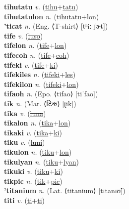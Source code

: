 \textbf{tihutatu} \textit{v.} (\hyperref[tihu]{tihu}+\hyperref[tatu]{tatu})
 \label{tihutatu} \\
\textbf{tihutatulon} \textit{n.} (\hyperref[tihutatu]{tihutatu}+\hyperref[lon]{lon})
 \label{tihutatulon} \\
\textbf{'ticat} \textit{n.} (Eng. ⟨T-shirt⟩ [tʰiː ʃɚt])
 \label{'ticat} \\
\textbf{tife} \textit{v.} (\hyperref[luso]{\sout{luso}})
 \label{tife} \\
\textbf{tifelon} \textit{n.} (\hyperref[tife]{tife}+\hyperref[lon]{lon})
 \label{tifelon} \\
\textbf{tifecoh} \textit{n.} (\hyperref[tife]{tife}+\hyperref[coh]{coh})
 \label{tifecoh} \\
\textbf{tifeki} \textit{v.} (\hyperref[tife]{tife}+\hyperref[ki]{ki})
 \label{tifeki} \\
\textbf{tifekiles} \textit{n.} (\hyperref[tifeki]{tifeki}+\hyperref[les]{les})
 \label{tifekiles} \\
\textbf{tifekilon} \textit{n.} (\hyperref[tifeki]{tifeki}+\hyperref[lon]{lon})
 \label{tifekilon} \\
\textbf{tifaoh} \textit{n.} (Epo. ⟨tifao⟩ [tiˈfao])
 \label{tifaoh} \\
\textbf{tik} \textit{n.} (Mar. ⟨टिक⟩ [ʈik])
 \label{tik} \\
\textbf{tika} \textit{v.} (\hyperref[luna]{\sout{luna}})
 \label{tika} \\
\textbf{tikalon} \textit{n.} (\hyperref[tika]{tika}+\hyperref[lon]{lon})
 \label{tikalon} \\
\textbf{tikaki} \textit{v.} (\hyperref[tika]{tika}+\hyperref[ki]{ki})
 \label{tikaki} \\
\textbf{tiku} \textit{v.} (\hyperref[luni]{\sout{luni}})
 \label{tiku} \\
\textbf{tikulon} \textit{n.} (\hyperref[tiku]{tiku}+\hyperref[lon]{lon})
 \label{tikulon} \\
\textbf{tikulyan} \textit{n.} (\hyperref[tiku]{tiku}+\hyperref[lyan]{lyan})
 \label{tikulyan} \\
\textbf{tikuki} \textit{v.} (\hyperref[tiku]{tiku}+\hyperref[ki]{ki})
 \label{tikuki} \\
\textbf{tikpic} \textit{n.} (\hyperref[tik]{tik}+\hyperref[pic]{pic})
 \label{tikpic} \\
\textbf{'titanium} \textit{n.} (Lat. ⟨titanium⟩ [tɪtanɪʊ̃])
 \label{'titanium} \\
\textbf{titi} \textit{v.} (\hyperref[ti]{ti}+\hyperref[ti]{ti})

